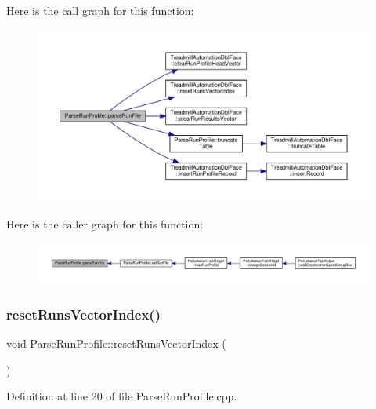 Here is the call graph for this function\+:
\nopagebreak
\begin{figure}[H]
\begin{center}
\leavevmode
\includegraphics[width=350pt]{class_parse_run_profile_a4d7cec4c1bf3b5f2ca41edabb098ac45_cgraph}
\end{center}
\end{figure}
Here is the caller graph for this function\+:
\nopagebreak
\begin{figure}[H]
\begin{center}
\leavevmode
\includegraphics[width=350pt]{class_parse_run_profile_a4d7cec4c1bf3b5f2ca41edabb098ac45_icgraph}
\end{center}
\end{figure}
\mbox{\label{class_parse_run_profile_aa5c2150a210598d9f14a04ff847ee0f3}} 
\subsubsection{\texorpdfstring{reset\+Runs\+Vector\+Index()}{resetRunsVectorIndex()}}
{\footnotesize\ttfamily void Parse\+Run\+Profile\+::reset\+Runs\+Vector\+Index (\begin{DoxyParamCaption}{ }\end{DoxyParamCaption})}



Definition at line 20 of file Parse\+Run\+Profile.\+cpp.

